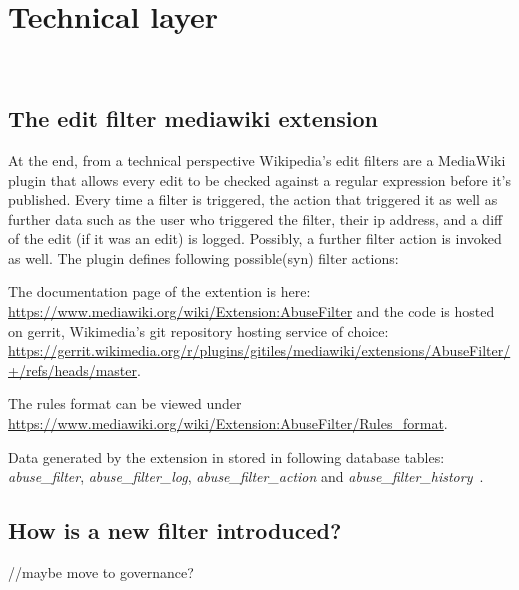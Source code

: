 \documentclass{sigchi}
\begin{document}

\section{Technical layer}
~\label{sec:technical-layer}

\subsection{The edit filter mediawiki extension}

At the end, from a technical perspective Wikipedia's edit filters are a MediaWiki plugin that allows every edit to be checked against a regular expression before it's published.
Every time a filter is triggered, the action that triggered it as well as further data such as the user who triggered the filter, their ip address, and a diff of the edit (if it was an edit) is logged.
Possibly, a further filter action is invoked as well.
The plugin defines following possible(syn) filter actions: %

The documentation page of the extention is here: \url{https://www.mediawiki.org/wiki/Extension:AbuseFilter}
and the code is hosted on gerrit, Wikimedia's git repository hosting service of choice: \url{https://gerrit.wikimedia.org/r/plugins/gitiles/mediawiki/extensions/AbuseFilter/+/refs/heads/master}.

The rules format can be viewed under \url{https://www.mediawiki.org/wiki/Extension:AbuseFilter/Rules_format}.


Data generated by the extension in stored in following database tables: \emph{abuse\_filter}, \emph{abuse\_filter\_log}, \emph{abuse\_filter\_action} and \emph{abuse\_filter\_history}~\cite{gerrit-abusefilter}.

\subsection{How is a new filter introduced?}
//maybe move to governance?
\end{document}
